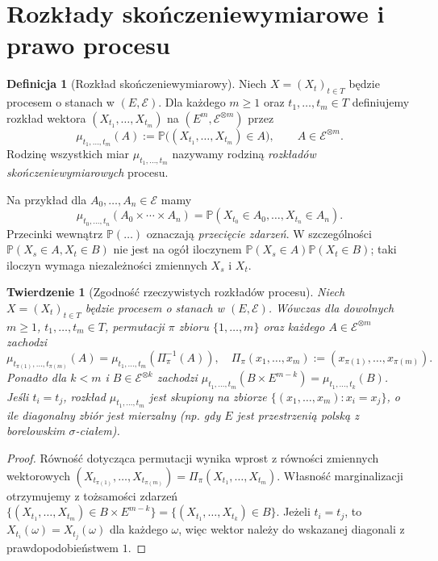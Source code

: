 \documentclass[11pt,a4paper,oneside]{report}
\numberwithin{equation}{chapter}
\theoremstyle{plain}
\newtheorem{twierdzenie}{Twierdzenie}[chapter]
\theoremstyle{definition}
\newtheorem{definicja}{Definicja}[chapter]
\theoremstyle{remark}
\newcommand{\Prob}{\mathbb{P}}
\newcommand{\calE}{\mathcal{E}}
\begin{document}
\section{Rozkłady skończeniewymiarowe i prawo procesu}
\begin{definicja}[Rozkład skończeniewymiarowy]
Niech $X=(X_t)_{t\in T}$ będzie procesem o stanach w $(E,\calE)$.
Dla każdego $m\ge1$ oraz $t_1,\ldots,t_m\in T$ definiujemy
rozkład wektora $(X_{t_1},\ldots,X_{t_m})$ na
$(E^m,\calE^{\otimes m})$ przez
\[
\mu_{t_1,\ldots,t_m}(A)
:=\Prob\big((X_{t_1},\ldots,X_{t_m})\in A\big),
\qquad A\in\calE^{\otimes m}.
\]
Rodzinę wszystkich miar $\mu_{t_1,\ldots,t_m}$ nazywamy rodziną
\emph{rozkładów skończeniewymiarowych} procesu.
\end{definicja}

Na przykład dla $A_0,\ldots,A_n\in\calE$ mamy
\[
\mu_{t_0,\ldots,t_n}(A_0\times\cdots\times A_n)
=\Prob(X_{t_0}\in A_0,\ldots,X_{t_n}\in A_n).
\]
Przecinki wewnątrz $\Prob(\ldots)$ oznaczają \emph{przecięcie zdarzeń}.
W szczególności $\Prob(X_s\in A,X_t\in B)$ nie jest na ogół
iloczynem $\Prob(X_s\in A)\Prob(X_t\in B)$; taki iloczyn
wymaga niezależności zmiennych $X_s$ i $X_t$.

\begin{twierdzenie}[Zgodność rzeczywistych rozkładów procesu]
Niech $X=(X_t)_{t\in T}$ będzie procesem o stanach w $(E,\calE)$.
Wówczas dla dowolnych $m\ge1$, $t_1,\ldots,t_m\in T$,
permutacji $\pi$ zbioru $\{1,\ldots,m\}$ oraz każdego
$A\in\calE^{\otimes m}$ zachodzi
\[
\mu_{t_{\pi(1)},\ldots,t_{\pi(m)}}(A)
=\mu_{t_1,\ldots,t_m}(\Pi_\pi^{-1}(A)),
\quad
\Pi_\pi(x_1,\ldots,x_m):=(x_{\pi(1)},\ldots,x_{\pi(m)}).
\]
Ponadto dla $k<m$ i $B\in\calE^{\otimes k}$ zachodzi
$\mu_{t_1,\ldots,t_m}(B\times E^{m-k})=\mu_{t_1,\ldots,t_k}(B)$.
Jeśli $t_i=t_j$, rozkład $\mu_{t_1,\ldots,t_m}$ jest skupiony na
zbiorze $\{(x_1,\ldots,x_m):x_i=x_j\}$, o ile diagonalny zbiór jest mierzalny
(np. gdy $E$ jest przestrzenią polską z borelowskim $\sigma$-ciałem).
\end{twierdzenie}
\begin{proof}
Równość dotycząca permutacji wynika wprost z równości zmiennych
wektorowych
$(X_{t_{\pi(1)}},\ldots,X_{t_{\pi(m)}})
=\Pi_\pi(X_{t_1},\ldots,X_{t_m})$.
Własność marginalizacji otrzymujemy z tożsamości zdarzeń
$\{(X_{t_1},\ldots,X_{t_m})\in B\times E^{m-k}\}
=\{(X_{t_1},\ldots,X_{t_k})\in B\}$.
Jeżeli $t_i=t_j$, to $X_{t_i}(\omega)=X_{t_j}(\omega)$
dla każdego $\omega$, więc wektor należy do wskazanej diagonali
z prawdopodobieństwem $1$.
\end{proof}
\end{document}
